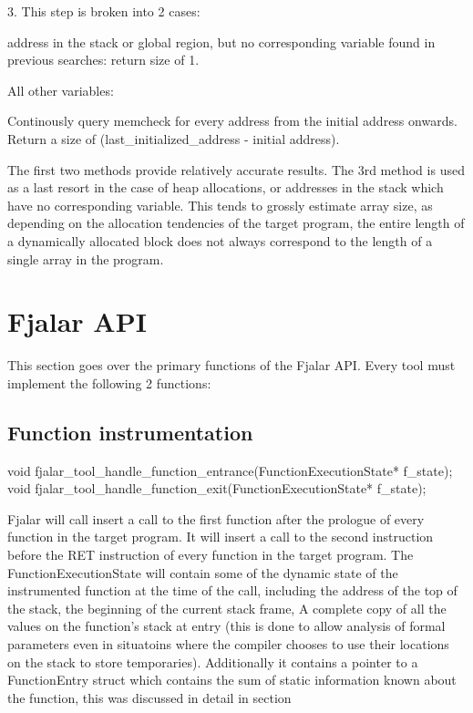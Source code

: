 \documentclass[11pt]{article}
\begin{document}
3. This step is broken into 2 cases:

   address in the stack or global region, but no corresponding
   variable found in previous searches: return size of 1.

   All other variables:
   
   Continously query memcheck for every address from the initial
   address onwards. Return a size of (last\_initialized\_address -
   initial address).


The first two methods provide relatively accurate results. The 3rd
method is used as a last resort in the case of heap allocations, or
addresses in the stack which have no corresponding variable. This
tends to grossly estimate array size, as depending on the allocation
tendencies of the target program, the entire length of a dynamically
allocated block does not always correspond to the length of a single
array in the program.


\section{Fjalar API}

This section goes over the primary functions of the Fjalar API. Every
tool must implement the following 2 functions:

\subsection{Function instrumentation}

void fjalar\_tool\_handle\_function\_entrance(FunctionExecutionState* f\_state);
void fjalar\_tool\_handle\_function\_exit(FunctionExecutionState*
f\_state);

Fjalar will call insert a call to the first function after the
prologue of every function in the target program. It will insert a
call to the second instruction before the RET instruction of every
function in the target program. The FunctionExecutionState will
contain some of the dynamic state of the instrumented function at the
time of the call, including the address of the top of the stack, the
beginning of the current stack frame, A complete copy of all the
values on the function's stack at entry (this is done to allow
analysis of formal parameters even in situatoins where the compiler
chooses to use their locations on the stack to store temporaries). 
Additionally it contains a pointer to a FunctionEntry struct which
contains the sum of static information known about the function, this
was discussed in detail in section %
\end{document}
